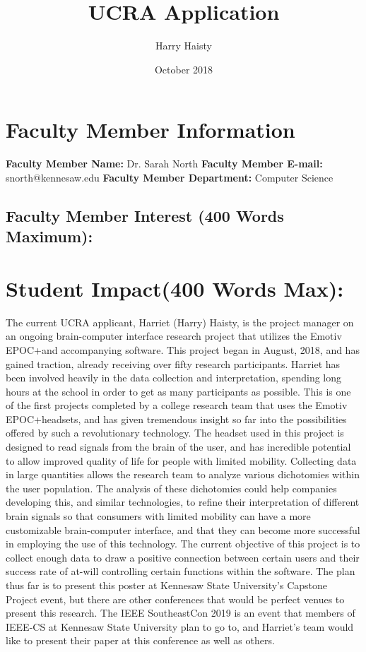 \documentclass{article}
\title{UCRA Application}
\author{Harry Haisty}
\date{October 2018}
\begin{document}
\section*{Faculty Member Information}

\textbf{Faculty Member Name:} Dr. Sarah North \newline
\textbf{Faculty Member E-mail:} snorth@kennesaw.edu \newline
\textbf{Faculty Member Department:} Computer Science 

\subsection*{Faculty Member Interest (400 Words Maximum):} 


\section*{Student Impact(400 Words Max):}
The current UCRA applicant, Harriet (Harry) Haisty, is the project manager on an ongoing brain-computer interface research project that utilizes the Emotiv EPOC+\texttrademark and accompanying software. This project began in August, 2018, and has gained traction, already receiving over fifty research participants. Harriet has been involved heavily in the data collection and interpretation, spending long hours at the school in order to get as many participants as possible. 
\newline \newline
This is one of the first projects completed by a college research team that uses the Emotiv EPOC+\texttrademark headsets, and has given tremendous insight so far into the possibilities offered by such a revolutionary technology. The headset used in this project is designed to read signals from the brain of the user, and has incredible potential to allow improved quality of life for people with limited mobility. Collecting data in large quantities allows the research team to analyze various dichotomies within the user population. 
\newline \newline
The analysis of these dichotomies could help companies developing this, and similar technologies, to refine their interpretation of different brain signals so that consumers with limited mobility can have a more customizable brain-computer interface, and that they can become more successful in employing the use of this technology. 
\newline \newline
The current objective of this project is to collect enough data to draw a positive connection between certain users and their success rate of at-will controlling certain functions within the software. The plan thus far is to present this poster at Kennesaw State University's Capstone Project event, but there are other conferences that would be perfect venues to present this research. The IEEE SoutheastCon 2019 is an event that members of IEEE-CS at Kennesaw State University plan to go to, and Harriet's team would like to present their paper at this conference as well as others. 
\end{document}
